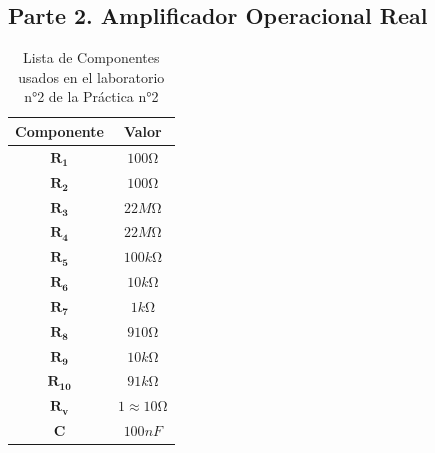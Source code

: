 \subsection{Parte 2. Amplificador Operacional Real}


\begin{table}[H]
    \centering
    \begin{tabular}{|c|c|}
        \hline
        \textbf{Componente} & \textbf{Valor} \\\hline
        $\mathbf{R_1}$ &  $100\si{\ohm}$ \\\hline
        $\mathbf{R_2}$ & $100 \si{\ohm}$  \\\hline
        $\mathbf{R_3}$ & $22 M \si{\ohm}$  \\\hline
        $\mathbf{R_4}$ & $22 M \si{\ohm}$   \\\hline
        $\mathbf{R_5}$ & $100k\si{\ohm}$  \\\hline
        $\mathbf{R_6}$  & $10k\si{\ohm}$ \\\hline
        $\mathbf{R_7}$  & $1k\si{\ohm}$ \\\hline
        $\mathbf{R_8}$  & $910\si{\ohm}$ \\\hline
        $\mathbf{R_9}$  & $10k\si{\ohm}$ \\\hline
        $\mathbf{R_{10}}$  & $91k\si{\ohm}$ \\\hline
        $\mathbf{R_v}$  & $1\approx 10 \si{\ohm}$ \\\hline
        $\mathbf{C}$  & $100 nF$ \\\hline
    \end{tabular}
    \caption{Lista de Componentes usados en el laboratorio n°2 de la Práctica n°2}
    \label{tab:componentes_1}
\end{table}

